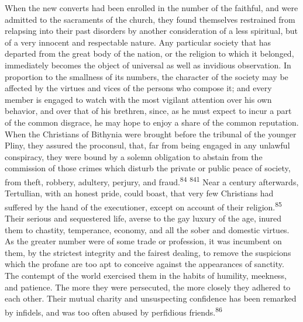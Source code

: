 
When the new converts had been enrolled in the number of the
faithful, and were admitted to the sacraments of the church, they
found themselves restrained from relapsing into their past
disorders by another consideration of a less spiritual, but of a
very innocent and respectable nature. Any particular society that
has departed from the great body of the nation, or the religion
to which it belonged, immediately becomes the object of universal
as well as invidious observation. In proportion to the smallness
of its numbers, the character of the society may be affected by
the virtues and vices of the persons who compose it; and every
member is engaged to watch with the most vigilant attention over
his own behavior, and over that of his brethren, since, as he
must expect to incur a part of the common disgrace, he may hope
to enjoy a share of the common reputation. When the Christians of
Bithynia were brought before the tribunal of the younger Pliny,
they assured the proconsul, that, far from being engaged in any
unlawful conspiracy, they were bound by a solemn obligation to
abstain from the commission of those crimes which disturb the
private or public peace of society, from theft, robbery,
adultery, perjury, and fraud.\textsuperscript{84} \textsuperscript{841} Near a century afterwards,
Tertullian, with an honest pride, could boast, that very few
Christians had suffered by the hand of the executioner, except on
account of their religion.\textsuperscript{85} Their serious and sequestered life,
averse to the gay luxury of the age, inured them to chastity,
temperance, economy, and all the sober and domestic virtues. As
the greater number were of some trade or profession, it was
incumbent on them, by the strictest integrity and the fairest
dealing, to remove the suspicions which the profane are too apt
to conceive against the appearances of sanctity. The contempt of
the world exercised them in the habits of humility, meekness, and
patience. The more they were persecuted, the more closely they
adhered to each other. Their mutual charity and unsuspecting
confidence has been remarked by infidels, and was too often
abused by perfidious friends.\textsuperscript{86}


